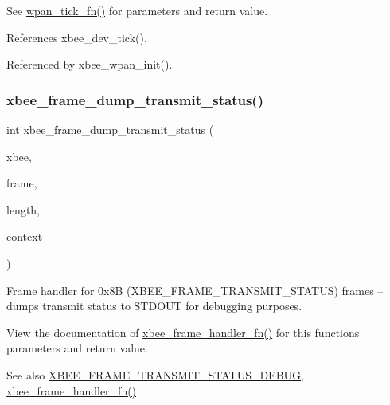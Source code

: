 See \hyperlink{group__wpan__aps_gafed1542f6becf2d81fd84ef2f0ae2833}{wpan\+\_\+tick\+\_\+fn()} for parameters and return value. 

References xbee\+\_\+dev\+\_\+tick().



Referenced by xbee\+\_\+wpan\+\_\+init().

\mbox{\label{group__xbee__wpan_gaa750c530910a7d8324ba5579ee7fcb57}} 
\subsubsection{\texorpdfstring{xbee\+\_\+frame\+\_\+dump\+\_\+transmit\+\_\+status()}{xbee\_frame\_dump\_transmit\_status()}}
{\footnotesize\ttfamily int xbee\+\_\+frame\+\_\+dump\+\_\+transmit\+\_\+status (\begin{DoxyParamCaption}\item[{\hyperlink{structxbee__dev__t}{xbee\+\_\+dev\+\_\+t} $\ast$}]{xbee,  }\item[{const void \hyperlink{group__hal_gaef060b3456fdcc093a7210a762d5f2ed}{F\+AR} $\ast$}]{frame,  }\item[{\hyperlink{group__hal__dos_ga5a8b2dc9e45a9ee81a94ef304fb62505}{uint16\+\_\+t}}]{length,  }\item[{void \hyperlink{group__hal_gaef060b3456fdcc093a7210a762d5f2ed}{F\+AR} $\ast$}]{context }\end{DoxyParamCaption})}



Frame handler for 0x8B (X\+B\+E\+E\+\_\+\+F\+R\+A\+M\+E\+\_\+\+T\+R\+A\+N\+S\+M\+I\+T\+\_\+\+S\+T\+A\+T\+US) frames -- dumps transmit status to S\+T\+D\+O\+UT for debugging purposes. 

View the documentation of \hyperlink{group__xbee__device_ga3e6f2b540e8cec7a69ef0b0166da14ff}{xbee\+\_\+frame\+\_\+handler\+\_\+fn()} for this function\textquotesingle{}s parameters and return value.

\begin{DoxySeeAlso}{See also}
\hyperlink{wpan_8h_a607cf0696a8bc634ee8993f45200297b}{X\+B\+E\+E\+\_\+\+F\+R\+A\+M\+E\+\_\+\+T\+R\+A\+N\+S\+M\+I\+T\+\_\+\+S\+T\+A\+T\+U\+S\+\_\+\+D\+E\+B\+UG}, \hyperlink{group__xbee__device_ga3e6f2b540e8cec7a69ef0b0166da14ff}{xbee\+\_\+frame\+\_\+handler\+\_\+fn()} 
\end{DoxySeeAlso}


